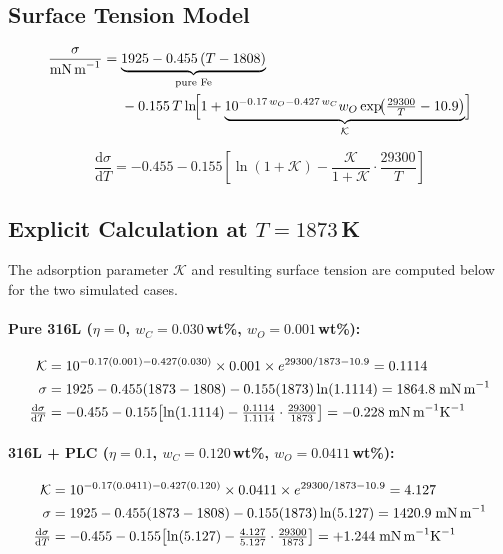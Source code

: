 \documentclass[11pt,a4paper]{article}
\begin{document}
\subsection{Surface Tension Model}

\begin{align}
  \frac{\sigma}{\text{mN\,m}^{-1}}
    &= \underbrace{1925 - 0.455\,(T-1808)}_{\text{pure Fe}} \notag\\
    &\phantom{{}={}}- 0.155\,T\ln\!\Bigl[
        1 + \underbrace{10^{-0.17\,w_O - 0.427\,w_C} w_O
        \exp\!\bigl(\tfrac{29300}{T}-10.9\bigr)}_{\mathcal{K}}
      \Bigr]
  \label{eq:sigma}
\end{align}

\begin{equation}
  \frac{\mathrm{d}\sigma}{\mathrm{d}T}
    = -0.455 - 0.155\!\left[\ln(1+\mathcal{K})
      - \frac{\mathcal{K}}{1+\mathcal{K}}\cdot\frac{29300}{T}\right]
  \label{eq:dsdt}
\end{equation}

\subsection{Explicit Calculation at $T=1873$\,K}

The adsorption parameter $\mathcal{K}$ and resulting surface tension are computed
below for the two simulated cases.

\paragraph{Pure 316L ($\eta=0$, $w_C=0.030$\,wt\%, $w_O=0.001$\,wt\%):}
\begin{align*}
  \mathcal{K} &= 10^{-0.17(0.001)-0.427(0.030)}\times 0.001
                 \times e^{29300/1873-10.9} = 0.1114 \\
  \sigma       &= 1925 - 0.455(1873-1808)
                 - 0.155(1873)\ln(1.1114) = 1864.8\;\text{mN\,m}^{-1} \\
  \tfrac{\mathrm{d}\sigma}{\mathrm{d}T}
               &= -0.455 - 0.155\!\left[\ln(1.1114)
                 -\tfrac{0.1114}{1.1114}\cdot\tfrac{29300}{1873}\right]
                 = -0.228\;\text{mN\,m}^{-1}\text{K}^{-1}
\end{align*}

\paragraph{316L + PLC ($\eta=0.1$, $w_C=0.120$\,wt\%, $w_O=0.0411$\,wt\%):}
\begin{align*}
  \mathcal{K} &= 10^{-0.17(0.0411)-0.427(0.120)}\times 0.0411
                 \times e^{29300/1873-10.9} = 4.127 \\
  \sigma       &= 1925 - 0.455(1873-1808)
                 - 0.155(1873)\ln(5.127) = 1420.9\;\text{mN\,m}^{-1} \\
  \tfrac{\mathrm{d}\sigma}{\mathrm{d}T}
               &= -0.455 - 0.155\!\left[\ln(5.127)
                 -\tfrac{4.127}{5.127}\cdot\tfrac{29300}{1873}\right]
                 = +1.244\;\text{mN\,m}^{-1}\text{K}^{-1}
\end{align*}
\end{document}
